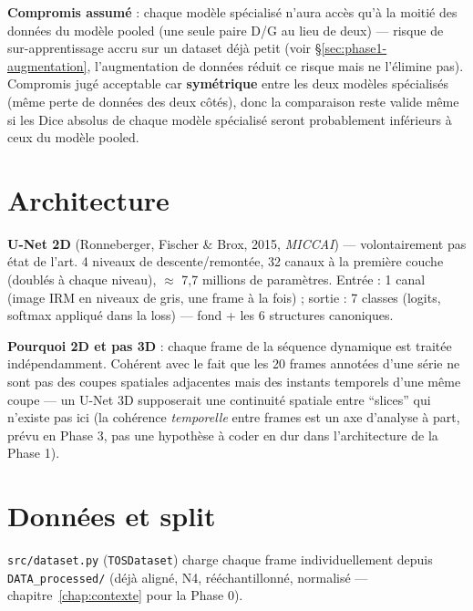 \textbf{Compromis assumé} : chaque modèle spécialisé n'aura accès qu'à la moitié des
données du modèle pooled (une seule paire D/G au lieu de deux) --- risque de
sur-apprentissage accru sur un dataset déjà petit (voir \S\ref{sec:phase1-augmentation},
l'augmentation de données réduit ce risque mais ne l'élimine pas). Compromis jugé
acceptable car \textbf{symétrique} entre les deux modèles spécialisés (même perte de
données des deux côtés), donc la comparaison reste valide même si les Dice absolus de
chaque modèle spécialisé seront probablement inférieurs à ceux du modèle pooled.


\section{Architecture}

\textbf{U-Net 2D} (Ronneberger, Fischer \& Brox, 2015, \emph{MICCAI}) --- volontairement
pas état de l'art. 4 niveaux de descente/remontée, 32 canaux à la première couche
(doublés à chaque niveau), $\approx$ 7,7 millions de paramètres. Entrée : 1 canal
(image IRM en niveaux de gris, une frame à la fois) ; sortie : 7 classes (logits,
softmax appliqué dans la loss) --- fond + les 6 structures canoniques.

\textbf{Pourquoi 2D et pas 3D} : chaque frame de la séquence dynamique est traitée
indépendamment. Cohérent avec le fait que les 20 frames annotées d'une série ne sont
pas des coupes spatiales adjacentes mais des instants temporels d'une même coupe --- un
U-Net 3D supposerait une continuité spatiale entre ``slices'' qui n'existe pas ici (la
cohérence \emph{temporelle} entre frames est un axe d'analyse à part, prévu en Phase 3,
pas une hypothèse à coder en dur dans l'architecture de la Phase 1).

\section{Données et split}

\texttt{src/dataset.py} (\texttt{TOSDataset}) charge chaque frame individuellement
depuis \texttt{DATA\_processed/} (déjà aligné, N4, rééchantillonné, normalisé ---
chapitre~\ref{chap:contexte} pour la Phase 0).

